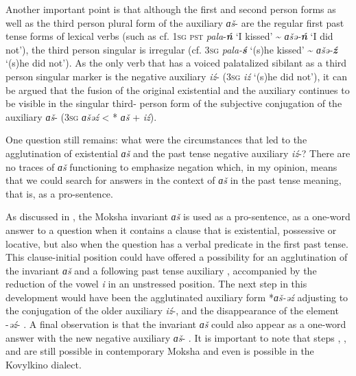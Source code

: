\documentclass[output=paper,colorlinks,citecolor=brown,draft,draftmode]{langscibook}
\begin{document}
  Another important point is that although the first and second person forms as well as the third person plural form of the auxiliary \textit{ɑš}- are the regular first past tense forms of lexical verbs (such as cf. 1\textsc{sg} \textsc{pst} \textit{pala}-\textbf{\textit{ń}} `I kissed' {\textasciitilde} \textit{ɑšə-}\textbf{\textit{ń}} `I did not'), the third person singular is irregular (cf. 3\textsc{sg} \textit{pala-}\textbf{\textit{ś}} `(s)he kissed' {\textasciitilde} \textit{ɑšə-}\textbf{\textit{ź}} `(s)he did not'). As the only verb that has a voiced palatalized sibilant as a third person singular marker is the negative auxiliary \textit{iź}- (3\textsc{sg} \textit{iź} `(s)he did not'), it can be argued that the fusion of the original existential and the auxiliary continues to be visible in the singular third- person form of the subjective conjugation of the auxiliary \textit{ɑš}- (3\textsc{sg} \textit{ɑšəź} < * \textit{ɑš} + \textit{iź}).

  One question still remains: what were the circumstances that led to the agglutination of existential \textit{ɑš} and the past tense negative auxiliary \textit{iź}-? There are no traces of \textit{ɑš} functioning to emphasize negation which, in my opinion, means that we could search for answers in the context of \textit{ɑš} in the past tense meaning, that is, as a pro-sentence.

As discussed in , the Moksha invariant \textit{ɑš} is
used as a pro-sentence, as a one-word answer to a question when it contains
a clause that is existential, possessive or locative, but also when the
question has a verbal predicate in the first past tense. This
clause-initial position  could have offered a
possibility for an agglutination of the invariant \textit{ɑš} and a
following past tense auxiliary , accompanied by the
reduction of the vowel \textit{i} in an unstressed position. The next step
in this development would have been the agglutinated auxiliary form
\mbox{*\textit{ɑš-əź}} adjusting to the conjugation of the older auxiliary \textit{iź}-, and the disappearance of the element -\textit{əź}- . A final observation is that the invariant \textit{ɑš} could also appear as a one-word answer with the new negative auxiliary \textit{ɑš}- . It is important to note that steps , , and  are still possible in contemporary Moksha and even  is possible in the Kovylkino dialect.
\end{document}
